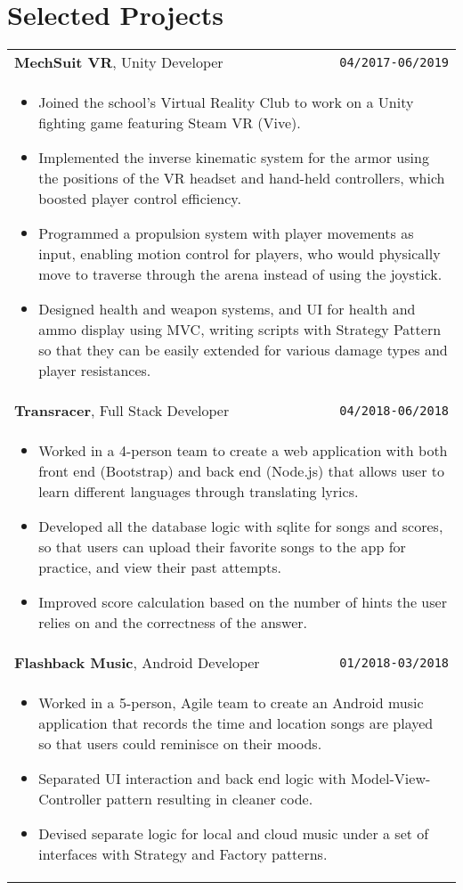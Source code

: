 \documentclass[10pt, letterpaper]{article}
\newcommand{\itemcols}[1]{
	\multicolumn{2}{p{\dimexpr \linewidth-2\tabcolsep}}{
	\begin{itemize}
		#1
	\end{itemize}
	}
}
\begin{document}
\section{Selected Projects}
\smallskip
\noindent
\begin{tabularx}{\linewidth}{X r}
	\textbf{\large MechSuit VR}, Unity Developer & \texttt{04/2017-06/2019} \\
	\itemcols{
		\item Joined the school's Virtual Reality Club to work on a Unity fighting game featuring Steam VR (Vive).
		\item Implemented the inverse kinematic system for the armor using the positions of the VR headset and hand-held controllers, which boosted player control efficiency.
		\item Programmed a propulsion system with player movements as input, enabling motion control for players, who would physically move to traverse through the arena instead of using the joystick.
		\item Designed health and weapon systems, and UI for health and ammo display using MVC, writing scripts with Strategy Pattern so that they can be easily extended for various damage types and player resistances.
	} \\
	
	\textbf{\large Transracer}, Full Stack Developer & \texttt{04/2018-06/2018} \\
	\itemcols{
		\item Worked in a 4-person team to create a web application with both front end (Bootstrap) and back end (Node.js) that allows user to learn different languages through translating lyrics.
		\item Developed all the database logic with sqlite for songs and scores, so that users can upload their favorite songs to the app for practice, and view their past attempts.
		\item Improved score calculation based on the number of hints the user relies on and the correctness of the answer.
	} \\
	
	\textbf{\large Flashback Music}, Android Developer & \texttt{01/2018-03/2018} \\
	\itemcols{
		\item Worked in a 5-person, Agile team to create an Android music application that records the time and location songs are played so that users could reminisce on their moods.
		\item Separated UI interaction and back end logic with Model-View-Controller pattern resulting in cleaner code.
		\item Devised separate logic for local and cloud music under a set of interfaces with Strategy and Factory patterns.
	}
\end{tabularx}
\end{document}
